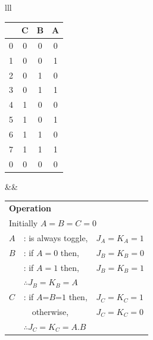 \vspace{2em}
\begin{tabular}{lll}
   \begin{adjustbox}{valign=t}
   \begin{tabularx}{6cm}{|r|C|C|C|}\hline
      & C & B & A \\ & 0 & 0 & 0 \\
      1 & 0 & 0 & 1 \\
      2 & 0 & 1 & 0 \\
      3 & 0 & 1 & 1 \\
      4 & 1 & 0 & 0 \\
      5 & 1 & 0 & 1 \\
      6 & 1 & 1 & 0 \\
      7 & 1 & 1 & 1 \\ & 0 & 0 & 0 \\\hline
   \end{tabularx}
   \end{adjustbox}
   &\vspace{2ex}&
   \begin{adjustbox}{valign=t}
     \begin{tabularx}{6.5cm}{lXl}
      \multicolumn{3}{l}{\textbf{Operation}}\\
      \multicolumn{3}{l}{Initially $A=B=C=0$}\\[1em]
      $A$ & : is always toggle,& $J_A = K_A = 1$ \\[1em]
      $B$ & : if $A=0$ then,& $J_B = K_B = 0$ \\
       & : if $A=1$ then,& $J_B = K_B = 1$ \\
      &\multicolumn{2}{l}{$\therefore J_B = K_B = A$}\\[1em]
      $C$ & : if $A\text{=}B\text{=}1$ then,& $J_C = K_C = 1$ \\
       & \ \ otherwise,& $J_C = K_C = 0$ \\
      &\multicolumn{2}{l}{$\therefore J_C = K_C = A.B$}\\
     \end{tabularx}
   \end{adjustbox}
\end{tabular}

